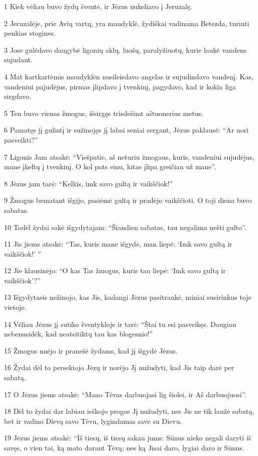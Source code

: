 \par 1 Kiek vėliau buvo žydų šventė, ir Jėzus nukeliavo į Jeruzalę. 
\par 2 Jeruzalėje, prie Avių vartų, yra maudyklė, žydiškai vadinama Betezda, turinti penkias stogines. 
\par 3 Jose gulėdavo daugybė ligonių­ aklų, luošų, paralyžiuotų, kurie laukė vandens sujudant. 
\par 4 Mat kartkartėmis maudyklėn nusileisdavo angelas ir sujudindavo vandenį. Kas, vandeniui pajudėjus, pirmas įlipdavo į tvenkinį, pagydavo, kad ir kokia liga sirgdavo. 
\par 5 Ten buvo vienas žmogus, išsirgęs trisdešimt aštuonerius metus. 
\par 6 Pamatęs jį gulintį ir sužinojęs jį labai seniai sergant, Jėzus paklausė: “Ar nori pasveikti?” 
\par 7 Ligonis Jam atsakė: “Viešpatie, aš neturiu žmogaus, kuris, vandeniui sujudėjus, mane įkeltų į tvenkinį. O kol pats einu, kitas įlipa greičiau už mane”. 
\par 8 Jėzus jam tarė: “Kelkis, imk savo gultą ir vaikščiok!” 
\par 9 Žmogus bematant išgijo, pasiėmė gultą ir pradėjo vaikščioti. O toji diena buvo sabatas. 
\par 10 Todėl žydai sakė išgydytajam: “Šiandien sabatas, tau negalima nešti gulto”. 
\par 11 Jis jiems atsakė: “Tas, kuris mane išgydė, man liepė: ‘Imk savo gultą ir vaikščiok!’ ” 
\par 12 Jie klausinėjo: “O kas Tas žmogus, kuris tau liepė: ‘Imk savo gultą ir vaikščiok’?” 
\par 13 Išgydytasis nežinojo, kas Jis, kadangi Jėzus pasitraukė, miniai susirinkus toje vietoje. 
\par 14 Vėliau Jėzus jį sutiko šventykloje ir tarė: “Štai tu esi pasveikęs. Daugiau nebenusidėk, kad neatsitiktų tau kas blogesnio!” 
\par 15 Žmogus nuėjo ir pranešė žydams, kad jį išgydė Jėzus. 
\par 16 Žydai dėl to persekiojo Jėzų ir norėjo Jį nužudyti, kad Jis taip darė per sabatą. 
\par 17 O Jėzus jiems atsakė: “Mano Tėvas darbuojasi lig šiolei, ir Aš darbuojuosi”. 
\par 18 Dėl to žydai dar labiau ieškojo progos Jį nužudyti, nes Jis ne tik laužė sabatą, bet ir vadino Dievą savo Tėvu, lygindamas save su Dievu. 
\par 19 Jėzus jiems atsakė: “Iš tiesų, iš tiesų sakau jums: Sūnus nieko negali daryti iš savęs, o vien tai, ką mato darant Tėvą; nes ką Jisai daro, lygiai daro ir Sūnus. 
